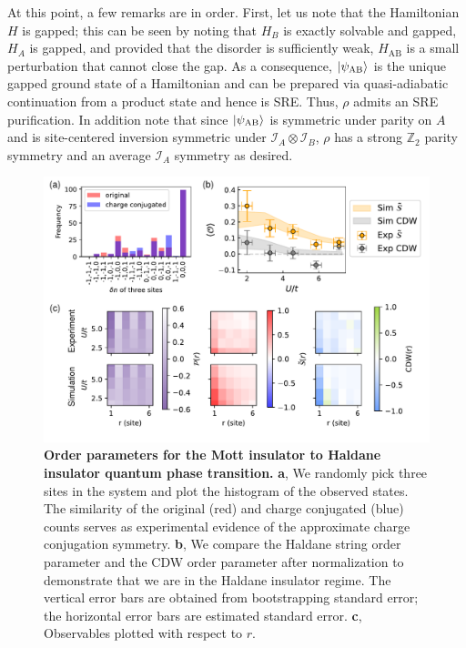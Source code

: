 \documentclass[preprint,superscriptaddress,floatfix, nofootinbib]{revtex4-2}
\begin{document}
At this point, a few remarks are in order. 
%
First, let us note that the Hamiltonian $H$ is gapped; this can be seen by noting that $H_B$ is exactly solvable and gapped, $H_A$ is gapped, and provided that the disorder is sufficiently weak, $H_{\text{AB}}$ is a small perturbation that cannot close the gap. 
%
As a consequence, $\ket{\psi_{\text{AB}}}$ is the unique gapped ground state of a Hamiltonian and can be prepared via quasi-adiabatic continuation from a product state and hence is SRE.
%
Thus, $\rho$ admits an SRE purification.
%
In addition note that since $\ket{\psi_{\text{AB}}}$ is symmetric under parity on $A$ and is site-centered inversion symmetric under $\mathcal{I}_A \otimes \mathcal{I}_B$, $\rho$ has a strong $\mathbb{Z}_2$ parity symmetry and an average $\mathcal{I}_A$ symmetry as desired.

\begin{figure}
    \centering
    \includegraphics[width=\textwidth]{figures/HI_2D_OP.pdf}
    \caption{\textbf{Order parameters for the Mott insulator to Haldane insulator quantum phase transition.} \textbf{a}, We randomly pick three sites in the system and plot the histogram of the observed states. The similarity of the original (red) and charge conjugated (blue) counts serves as experimental evidence of the approximate charge conjugation symmetry. \textbf{b}, We compare the Haldane string order parameter and the CDW order parameter after normalization to demonstrate that we are in the Haldane insulator regime. The vertical error bars are obtained from bootstrapping standard error; the horizontal error bars are estimated standard error. \textbf{c}, Observables plotted with respect to $r$.
    }
    \label{fig: HI_2D_OP}
\end{figure}
\end{document}
